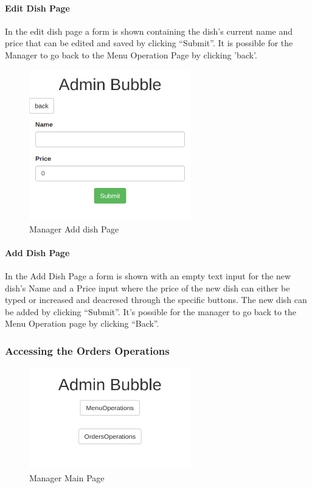 \paragraph{Edit Dish Page}
In the edit dish page a form is shown containing the dish's current name and price that can be edited and saved by clicking ``Submit''.
It is possible for the Manager to go back to the Menu Operation Page by clicking 'back'.

\begin{figure}[H]
	\centering
	\includegraphics[width=7cm]{../../documenti/UserManualDemo/demo_screens/admin_add.png}
	\caption{Manager Add dish Page}
\end{figure}
\paragraph{Add Dish Page}
In the Add Dish Page a form is shown with an empty text input for the new dish's Name and a Price input where the price of the new dish can either be typed or increased and deacresed through the specific buttons. The new dish can be added by clicking ``Submit''.
It's possible for the manager to go back to the Menu Operation page by clicking ``Back''.

\subsubsection{Accessing the Orders Operations}
\begin{figure}[H]
	\centering
	\includegraphics[width=7cm]{../../documenti/UserManualDemo/demo_screens/admin_main.png}
	\caption{Manager Main Page}
\end{figure}
